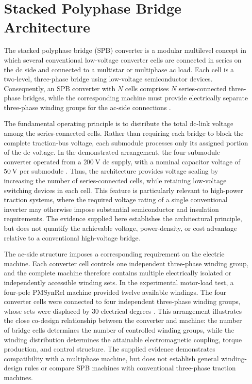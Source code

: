 \section{Stacked Polyphase Bridge Architecture}

The stacked polyphase bridge (SPB) converter is a modular multilevel concept in which several conventional low-voltage converter cells are connected in series on the dc side and connected to a multistar or multiphase ac load. Each cell is a two-level, three-phase bridge using low-voltage semiconductor devices. Consequently, an SPB converter with \(N\) cells comprises \(N\) series-connected three-phase bridges, while the corresponding machine must provide electrically separate three-phase winding groups for the ac-side connections \cite{Jin2017}.

The fundamental operating principle is to distribute the total dc-link voltage among the series-connected cells. Rather than requiring each bridge to block the complete traction-bus voltage, each submodule processes only its assigned portion of the dc voltage. In the demonstrated arrangement, the four-submodule converter operated from a \(200~\mathrm{V}\) dc supply, with a nominal capacitor voltage of \(50~\mathrm{V}\) per submodule \cite{Jin2017}. Thus, the architecture provides voltage scaling by increasing the number of series-connected cells, while retaining low-voltage switching devices in each cell. This feature is particularly relevant to high-power traction systems, where the required voltage rating of a single conventional inverter may otherwise impose substantial semiconductor and insulation requirements. The evidence supplied here establishes the architectural principle, but does not quantify the achievable voltage, power-density, or cost advantage relative to a conventional high-voltage bridge. %

The ac-side structure imposes a corresponding requirement on the electric machine. Each converter cell controls one independent three-phase winding group, and the complete machine therefore contains multiple electrically isolated or independently accessible winding sets. In the experimental motor-load test, a four-pole PMSynRel machine provided twelve available windings. The four converter cells were connected to four independent three-phase winding groups, whose sets were displaced by \(30\) electrical degrees \cite{Jin2017}. This arrangement illustrates the close co-design relationship between the converter and machine: the number of bridge cells determines the number of controlled winding groups, while the winding distribution determines the attainable electromagnetic coupling, torque production, and control structure. The supplied evidence demonstrates compatibility with a multiphase machine, but does not establish general winding-design rules or compare SPB machines with conventional three-phase traction machines. %

